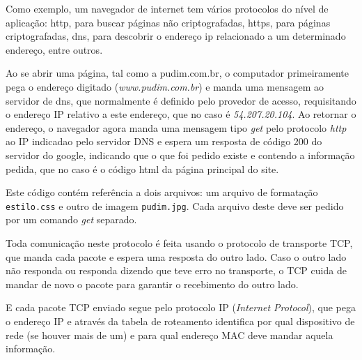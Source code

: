 Como exemplo, um navegador de internet tem vários protocolos do nível de aplicação: http, para buscar páginas não criptografadas, https, para páginas criptografadas, dns, para descobrir o endereço ip relacionado a um determinado endereço, entre outros.

Ao se abrir uma página, tal como a pudim.com.br, o computador primeiramente pega o endereço digitado (\emph{www.pudim.com.br}) e manda uma mensagem ao servidor de dns, que normalmente é definido pelo provedor de acesso, requisitando o endereço IP relativo a este endereço, que no caso é \emph{54.207.20.104}. Ao retornar o endereço, o navegador agora manda uma mensagem tipo \emph{get} pelo protocolo \emph{http} ao IP indicadao pelo servidor DNS e espera um resposta de código 200 do servidor do google, indicando que o que foi pedido existe e contendo a informação pedida, que no caso é o código html da página principal do site.

Este código contém referência a dois arquivos: um arquivo de formatação \verb|estilo.css| e outro de imagem \verb|pudim.jpg|. Cada arquivo deste deve ser pedido por um comando \emph{get} separado.

Toda comunicação neste protocolo é feita usando o protocolo de transporte TCP, que manda cada pacote e espera uma resposta do outro lado. Caso o outro lado não responda ou responda dizendo que teve erro no transporte, o TCP cuida de mandar de novo o pacote para garantir o recebimento do outro lado.

E cada pacote TCP enviado segue pelo protocolo IP (\emph{Internet Protocol}), que pega o endereço IP e através da tabela de roteamento identifica por qual dispositivo de rede (se houver mais de um) e para qual endereço MAC deve mandar aquela informação.